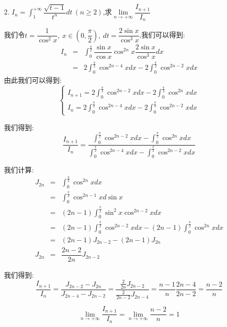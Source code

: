 2. $I_{n}=\int_{1}^{+\infty}\dfrac{\sqrt{t-1}}{t^n}dt\ (n\geq 2)$,求$\lim\limits_{n\rightarrow+\infty}\dfrac{I_{n+1}}{I_{n}}$
\begin{solution}
	
	我们令$t=\dfrac{1}{\cos^2 x},\ x\in(0,\dfrac{\pi}{2}),\ dt=\dfrac{2\sin x}{\cos^3 x}$,我们可以得到: 
	\begin{eqnarray*}
		I_{n}&=&\int_{0}^{\frac{\pi}{2}}\dfrac{\sin x}{\cos x}\cos^{2n}x\dfrac{2\sin x}{\cos^3 x}dx\\
		&=&2\int_{0}^{\frac{\pi}{2}}\cos^{2n-4}xdx-2\int_{0}^{\frac{\pi}{2}}\cos^{2n-2}xdx
	\end{eqnarray*}
	由此我们可以得到: 
	$$\left\lbrace
	\begin{array}{l}
		I_{n+1}=2\int_{0}^{\frac{\pi}{2}}\cos^{2n-2}xdx-2\int_{0}^{\frac{\pi}{2}}\cos^{2n}xdx\\
		I_{n}=2\int_{0}^{\frac{\pi}{2}}\cos^{2n-4}xdx-2\int_{0}^{\frac{\pi}{2}}\cos^{2n-2}xdx
	\end{array}
	\right. $$
	
	我们得到: 
	$$\dfrac{I_{n+1}}{I_{n}}=\dfrac{\int_{0}^{\frac{\pi}{2}}\cos^{2n-2}xdx-\int_{0}^{\frac{\pi}{2}}\cos^{2n}xdx}{\int_{0}^{\frac{\pi}{2}}\cos^{2n-4}xdx-\int_{0}^{\frac{\pi}{2}}\cos^{2n-2}xdx}$$
	
	我们计算: 
	\begin{eqnarray*}
		J_{2n}&=&\int_{0}^{\frac{\pi}{2}}\cos^{2n}xdx\\
		&=&\int_{0}^{\frac{\pi}{2}}\cos^{2n-1}xd\sin x\\
		&=&(2n-1)\int_{0}^{\frac{\pi}{2}}\sin^{2} x\cos^{2n-2}xdx\\
		&=&(2n-1)\int_{0}^{\frac{\pi}{2}}\cos^{2n-2}xdx-(2n-1)\int_{0}^{\frac{\pi}{2}}\cos^{2n}xdx\\
		&=&(2n-1)J_{2n-2}-(2n-1)J_{2n}\\
		J_{2n}&=&\dfrac{2n-2}{2n}J_{2n-2}
	\end{eqnarray*}

	我们得到: 
	$$\dfrac{I_{n+1}}{I_{n}}=\dfrac{J_{2n-2}-J_{2n}}{J_{2n-4}-J_{2n-2}}=\dfrac{\frac{2}{2n}J_{2n-2}}{\frac{2}{2n-2}J_{2n-4}}=\dfrac{n-1}{n}\dfrac{2n-4}{2n-2}=\dfrac{n-2}{n}$$
	
	$$\lim\limits_{n\rightarrow+\infty}\dfrac{I_{n+1}}{I_{n}}=\lim\limits_{n\rightarrow+\infty}\dfrac{n-2}{n}=1$$
\end{solution}
